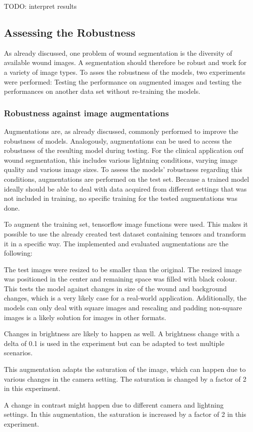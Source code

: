 TODO: interpret results

\subsection{Assessing the Robustness}

As already discussed, one problem of wound segmentation is the diversity of available wound images. A segmentation should therefore be robust and work for a variety of image types. To asses the robustness of the models, two experiments were performed: Testing the performance on augmented images and testing the performances on another data set without re-training the models.

\subsubsection{Robustness against image augmentations}

Augmentations are, as already discussed, commonly performed to improve the robustness of models. Analogously, augmentations can be used to access the robustness of the resulting model during testing. For the clinical application ouf wound segmentation, this includes various lightning conditions, varying image quality and various image sizes. To assess the models' robustness regarding this conditions, augmentations are performed on the test set. Because a trained model ideally should be able to deal with data acquired from different settings that was not included in training, no specific training for the tested augmentations was done.

To augment the training set, tensorflow image functions were used. This makes it possible to use the already created test dataset containing tensors and transform it in a specific way. The implemented and evaluated augmentations are the following:

\begin{description}[leftmargin=10px]
	\item[Embed] The test images were resized to be smaller than the original. The resized image was positioned in the center and remaining space was filled with black colour. This tests the model against changes in size of the wound and background changes, which is a very likely case for a real-world application. Additionally, the models can only deal with square images and rescaling and padding non-square images is a likely solution for images in other formats.
	\item[Brightness] Changes in brightness are likely to happen as well. A brightness change with a delta of 0.1 is used in the experiment but can be adapted to test multiple scenarios.
	\item[Saturation] This augmentation adapts the saturation of the image, which can happen due to various changes in the camera setting. The saturation is changed by a factor of 2 in this experiment.
	\item[Contrast] A change in contrast might happen due to different camera and lightning settings. In this augmentation, the saturation is increased by a factor of 2 in this experiment. 
\end{description}

